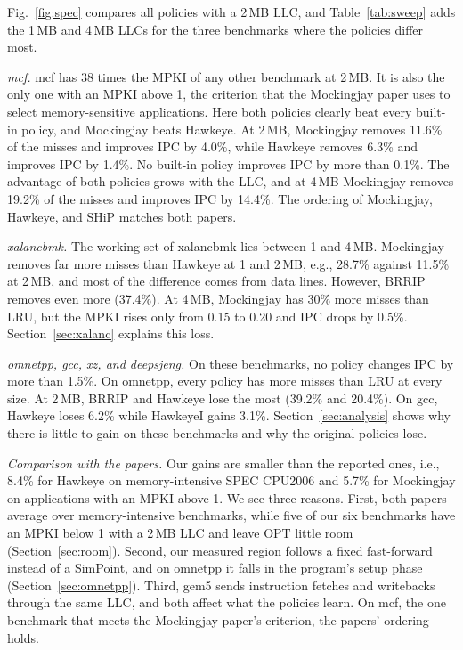 \documentclass[11pt,conference]{IEEEtran}
\begin{document}
Fig.~\ref{fig:spec} compares all policies with a 2\,MB LLC, and
Table~\ref{tab:sweep} adds the 1\,MB and 4\,MB LLCs for the three benchmarks
where the policies differ most.

\emph{mcf.} mcf has 38 times the MPKI of any other benchmark at 2\,MB. It is
also the only one with an MPKI above 1, the criterion that the Mockingjay paper
uses to select memory-sensitive applications. Here both policies clearly beat every built-in policy,
and Mockingjay beats Hawkeye. At 2\,MB, Mockingjay removes 11.6\% of the misses
and improves IPC by 4.0\%, while Hawkeye removes 6.3\% and improves IPC by
1.4\%. No built-in policy improves IPC by more than 0.1\%. The advantage of both
policies grows with the LLC, and at 4\,MB Mockingjay removes 19.2\% of the
misses and improves IPC by 14.4\%. The ordering of Mockingjay, Hawkeye, and
SHiP matches both papers.

\emph{xalancbmk.} The working set of xalancbmk lies between 1 and 4\,MB.
Mockingjay removes far more misses than Hawkeye at 1 and 2\,MB, e.g., 28.7\%
against 11.5\% at 2\,MB, and most of the difference comes from data lines. However, BRRIP removes even more (37.4\%). At 4\,MB, Mockingjay has 30\%
more misses than LRU, but the MPKI rises only from 0.15 to 0.20 and IPC drops
by 0.5\%. Section~\ref{sec:xalanc} explains this loss.

\emph{omnetpp, gcc, xz, and deepsjeng.} On these benchmarks, no policy changes
IPC by more than 1.5\%. On omnetpp, every policy has more misses than LRU at
every size. At 2\,MB, BRRIP and Hawkeye lose the most (39.2\% and 20.4\%). On gcc, Hawkeye loses
6.2\% while HawkeyeI gains 3.1\%. Section~\ref{sec:analysis} shows why there is
little to gain on these benchmarks and why the original policies lose.

\emph{Comparison with the papers.} Our gains are smaller than the reported
ones, i.e., 8.4\% for Hawkeye on memory-intensive SPEC CPU2006 and 5.7\% for
Mockingjay on applications with an MPKI above 1. We see three reasons. First,
both papers average over memory-intensive benchmarks, while five of our six
benchmarks have an MPKI below 1 with a 2\,MB LLC and leave OPT little room
(Section~\ref{sec:room}). Second, our measured region follows a fixed
fast-forward instead of a SimPoint, and on omnetpp it falls in the program's
setup phase (Section~\ref{sec:omnetpp}). Third, gem5 sends instruction fetches
and writebacks through the same LLC, and both affect what the policies learn.
On mcf, the one benchmark that meets the Mockingjay paper's criterion, the
papers' ordering holds.
\end{document}
